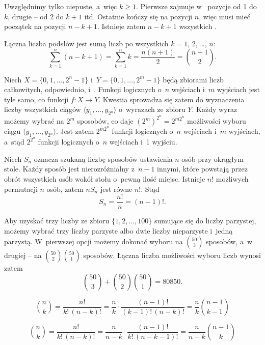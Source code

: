 
\exercise %
Uwzględnimy tylko  niepuste, a~więc $k\ge1$.
Pierwsze  zajmuje w~ pozycje od 1 do $k$, drugie -- od 2 do $k+1$ itd.
Ostatnie  kończy się na pozycji $n$, więc musi mieć początek na pozycji $n-k+1$.
Istnieje zatem $n-k+1$ wszystkich  .

Łączna liczba podsłów  jest sumą liczb  po wszystkich $k=1$, 2, \dots, $n$:
\[
	\sum_{k=1}^n(n-k+1) = \sum_{k=1}^nk = \frac{n(n+1)}{2} = \binom{n+1}{2}.
\]

\exercise %
Niech $X=\{0,1,\dots,2^n-1\}$ i~$Y=\{0,1,\dots,2^m-1\}$ będą zbiorami liczb całkowitych, odpowiednio,  i~.
Funkcji logicznych o~$n$ wejściach i~$m$ wyjściach jest tyle samo, co funkcji $f\colon X\to Y$.
Kwestia sprowadza się zatem do wyznaczenia liczby wszystkich ciągów $\langle y_1,\dots,y_{2^n}\!\rangle$ o~wyrazach ze zbioru $Y$.
Każdy wyraz możemy wybrać na $2^m$ sposobów, co daje $(2^m)^{2^n}=2^{m2^n}\!$ możliwości wyboru ciągu $\langle y_1,\dots,y_{2^n}\!\rangle$.
Jest zatem $2^{m2^n}\!$ funkcji logicznych o~$n$ wejściach i~$m$ wyjściach, a~stąd $2^{2^n}\!$ funkcji logicznych o~$n$ wejściach i~1 wyjściu.

\exercise %
Niech $S_n$ oznacza szukaną liczbę sposobów ustawienia $n$ osób przy okrągłym stole.
Każdy sposób jest nierozróżnialny z~$n-1$ innymi, które powstają przez obrót wszystkich osób wokół stołu o~pewną ilość miejsc.
Istnieje $n!$ możliwych permutacji $n$ osób, zatem $nS_n$ jest równe $n!$.
Stąd
\[
	S_n = \frac{n!}{n} = (n-1)!.
\]

\exercise %
Aby uzyskać trzy liczby ze zbioru $\{1,2,\dots,100\}$ sumujące się do liczby parzystej, możemy wybrać trzy liczby parzyste albo dwie liczby nieparzyste i~jedną parzystą.
W~pierwszej opcji możemy dokonać wyboru na $\binom{50}{3}$ sposobów, a~w drugiej -- na $\binom{50}{2}\binom{50}{1}$ sposobów.
Łączna liczba możliwości wyboru liczb wynosi zatem
\[
	\binom{50}{3}+\binom{50}{2}\binom{50}{1} = 80850.
\]

\exercise %
\[
	\binom{n}{k} = \frac{n!}{k!\,(n-k)!} = \frac{n}{k}\cdot\frac{(n-1)!}{(k-1)!\,(n-k)!} = \frac{n}{k}\binom{n-1}{k-1}
\]

\exercise %
\[
	\binom{n}{k} = \frac{n!}{k!\,(n-k)!} = \frac{n}{n-k}\cdot\frac{(n-1)!}{k!\,(n-k-1)!} = \frac{n}{n-k}\binom{n-1}{k}
\]

